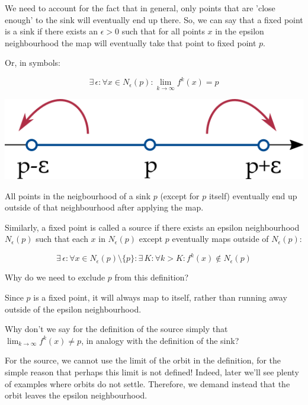 We need to account for the fact that in general, only points that are 'close enough' to the sink will eventually end up there. So, we can say that a fixed point is a sink if there exists an $\epsilon > 0$ such that for all points $x$ in the epsilon neighbourhood the map will eventually take that point to fixed point $p$.

Or, in symbols:

\begin{equation}
\exists \, \epsilon : \forall x \in  N_\epsilon(p) : \lim_{k \to \infty} f^k(x) = p
\end{equation}

\begin{marginfigure}
\centering
\includegraphics{dynamic/figures/source}
\caption{All points in the neigbourhood of a sink $p$ (except for $p$ itself) eventually end up outside of that neighbourhood after applying the map.}
\label{fig-source}
\end{marginfigure}

Similarly, a fixed point is called a source if there exists an epsilon neighbourhood $N_\epsilon(p)$ such that each $x$ in $N_\epsilon(p)$ except $p$ eventually maps outside of $N_\epsilon(p)$:

\begin{equation}
\exists \, \epsilon : \forall x \in  N_\epsilon(p) \setminus \{p\} : \exists \, K : \forall k > K : f^k(x) \notin  N_\epsilon(p)
\end{equation}

\begin{cue}
Why do we need to exclude $p$ from this definition?
\end{cue}

Since $p$ is a fixed point, it will always map to itself, rather than running away outside of the epsilon neighbourhood.

\begin{cue}
Why don't we say for the definition of the source simply that $\lim_{k \to \infty} f^k(x) \ne p$, in analogy with the definition of the sink?
\end{cue}

For the source, we cannot use the limit of the orbit in the definition, for the simple reason that perhaps this limit is not defined! Indeed, later we'll see plenty of examples where orbits do not settle. Therefore, we demand instead that the orbit leaves the epsilon neighbourhood.

